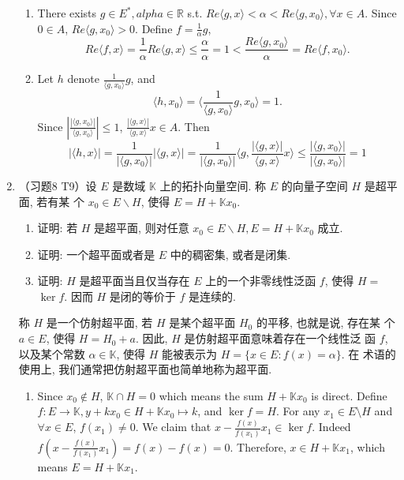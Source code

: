 \begin{enumerate}
\begin{enumerate}
    \end{enumerate}
    \begin{answer}
      \begin{enumerate}
        \item There exists $g\in E^*, alpha\in \mathbb R$ s.t. $Re\langle g, x\rangle < \alpha < Re \langle g, x_0\rangle, \forall x\in A$. Since $0 \in A$, $Re\langle g, x_0\rangle > 0$. Define $f = \frac1\alpha g$,
        \[Re\langle f, x\rangle = \frac1\alpha Re \langle g, x\rangle \leq \frac\alpha\alpha = 1< \frac{Re\langle g, x_0\rangle}{\alpha} = Re\langle f, x_0\rangle.\]
        \item Let $h$ denote $\frac1{\langle g, x_0\rangle} g$, and
        \[\langle h, x_0\rangle = \langle\frac{1}{\langle g, x_0\rangle}g, x_0\rangle = 1.\]
        Since $\left|\frac{|\langle g, x_0\rangle|}{\langle g, x_0\rangle}\right|\leq 1$, $\frac{|\langle g, x\rangle|}{\langle g, x\rangle}x\in A$. Then
        \[|\langle h, x\rangle| = \frac1{|\langle g, x_0\rangle|}|\langle g, x\rangle| = \frac1{|\langle g, x_0\rangle|}\langle g, \frac{|\langle g, x\rangle|}{\langle g, x\rangle}x\rangle\leq \frac{|\langle g, x_0\rangle|}{|\langle g, x_0\rangle|} = 1\]
    \end{enumerate}
    \end{answer}
  \item （习题8 T9）设 $E$ 是数域 $\mathbb{K}$ 上的拓扑向量空间. 称 $E$ 的向量子空间 $H$ 是超平面, 若有某 个 $x_{0} \in E \backslash H$, 使得 $E=H+\mathbb{K} x_{0}$.
    \begin{enumerate}
        \item 证明: 若 $H$ 是超平面, 则对任意 $x_{0} \in E \backslash H, E=H+\mathbb{K} x_{0}$ 成立.
        \item 证明: 一个超平面或者是 $E$ 中的稠密集, 或者是闭集.
        \item 证明: $H$ 是超平面当且仅当存在 $E$ 上的一个非零线性泛函 $f$, 使得 $H=$ $\operatorname{ker} f$. 因而 $H$ 是闭的等价于 $f$ 是连续的.
    \end{enumerate}
    称 $H$ 是一个仿射超平面, 若 $H$ 是某个超平面 $H_{0}$ 的平移, 也就是说, 存在某 个 $a \in E$, 使得 $H=H_{0}+a$. 因此, $H$ 是仿射超平面意味着存在一个线性泛 函 $f$, 以及某个常数 $\alpha \in \mathbb{K}$, 使得 $H$ 能被表示为 $H=\{x \in E: f(x)=\alpha\}$. 在 术语的使用上, 我们通常把仿射超平面也简单地称为超平面.
    \begin{answer}
      \begin{enumerate}
        \item Since $x_0\notin H$, $\mathbb K \cap H = 0$ which means the sum $H + \mathbb K x_0$ is direct. Define $f:E\to \mathbb K, y + k x_0\in H+\mathbb K x_0\mapsto k$, and $\ker f = H$. For any $x_1\in E\setminus H$ and $\forall x\in E$, $f(x_1)\neq  0$. We claim that $x - \frac{f(x)}{f(x_1)}x_1\in \ker f$. Indeed $f(x - \frac{f(x)}{f(x_1)}x_1) = f(x) - f(x) = 0$. Therefore, $x \in H + \mathbb K x_1$, which means $E = H + \mathbb K x_1$.

\end{enumerate}
\end{answer}
\end{enumerate}
